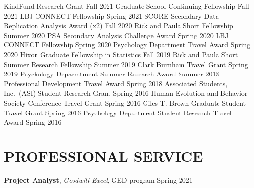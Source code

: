 \documentclass[10pt,]{article}
\begin{document}
KindFund Research Grant \hfill \textcolor{light-gray}{Fall 2021}
\newline Graduate School Continuing Fellowship
\hfill \textcolor{light-gray}{Fall 2021} \newline LBJ CONNECT Fellowship
\hfill \textcolor{light-gray}{Spring 2021} \newline SCORE Secondary Data
Replication Analysis Award (x2) \hfill \textcolor{light-gray}{Fall 2020}
\newline Rick and Paula Short Fellowship
\hfill \textcolor{light-gray}{Summer 2020} \newline PSA Secondary
Analysis Challenge Award \hfill \textcolor{light-gray}{Spring 2020}
\newline LBJ CONNECT Fellowship
\hfill \textcolor{light-gray}{Spring 2020} \newline Psychology
Department Travel Award \hfill \textcolor{light-gray}{Spring 2020}
\newline Hixon Graduate Fellowship in Statistics
\hfill \textcolor{light-gray}{Fall 2019} \newline Rick and Paula Short
Summer Research Fellowship \hfill \textcolor{light-gray}{Summer 2019}
\newline Clark Burnham Travel Grant
\hfill \textcolor{light-gray}{Spring 2019} \newline Psychology
Deparmtment Summer Research Award
\hfill \textcolor{light-gray}{Summer 2018} \newline Professional
Development Travel Award \hfill \textcolor{light-gray}{Spring 2018}
\newline Associated Students, Inc.~(ASI) Student Research Grant
\hfill \textcolor{light-gray}{Spring 2016} \newline Human Evolution and
Behavior Society Conference Travel Grant
\hfill \textcolor{light-gray}{Spring 2016} \newline Giles T. Brown
Graduate Student Travel Grant \hfill \textcolor{light-gray}{Spring 2016}
\newline Psychology Department Student Research Travel Award
\hfill \textcolor{light-gray}{Spring 2016}

\hypertarget{professional-service}{%
\section{PROFESSIONAL SERVICE}\label{professional-service}}

\textbf{Project Analyst}, \emph{Goodwill Excel}, GED program
\hfill \textcolor{light-gray}{Spring 2021}
\end{document}
